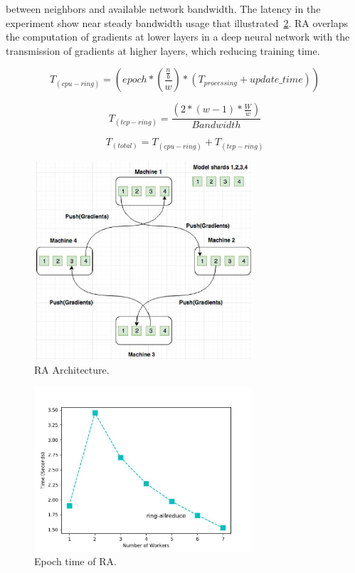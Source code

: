 \documentclass[conference]{IEEEtran}
\begin{document}
between neighbors and available network bandwidth. The latency in the experiment show near steady bandwidth usage that illustrated~\ref{fig:mpilatency}. RA overlaps the computation of gradients at lower layers in a deep neural network with the transmission of gradients at higher layers, which reducing training time.

\begin{equation}
T_{(cpu-ring)} = (epoch* (\frac{\frac{n}{b}}{w}) * (T_{processing}+ update\_time))
\end{equation}

\begin{equation}
T_{(tcp-ring)}  =  \frac{(2*(w-1)*\frac{W}{w})}{Bandwidth}
\end{equation}

\begin{equation}
T_{(total)} = T_{(cpu-ring)} + T_{(tcp-ring)}
\end{equation}

\begin{figure}[htb]
  \includegraphics[width=3.2in]{Fig/ring.jpg}
  \caption{RA Architecture.}
  \label{fig:ring}
\end{figure}

\begin{figure}[htb]
  \includegraphics[width=3.2in]{Fig/mpilatency.jpg}
  \caption{Epoch time of RA.}
  \label{fig:mpilatency}
\end{figure}
\end{document}
